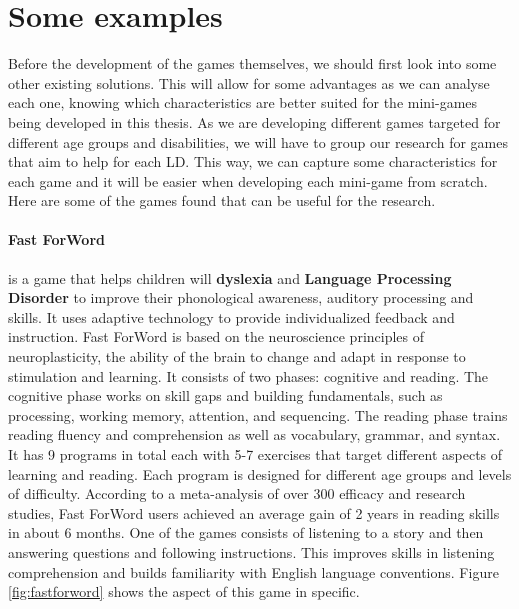 \section{Some examples}
\label{sec:gamesforld}

Before the development of the games themselves, we should first look into some other existing solutions. This will allow for some advantages as we can analyse each one, knowing which characteristics are better suited for the mini-games being developed in this thesis.
As we are developing different games targeted for different age groups and disabilities, we will have to group our research for games that aim to help for each LD. This way, we can capture some characteristics for each game and it will be easier when developing each mini-game from scratch.
Here are some of the games found that can be useful for the research.

\paragraph{Fast ForWord} \cite{fastforword} is a game that helps children will \textbf{dyslexia} and \textbf{Language Processing Disorder} to improve their phonological awareness, auditory processing and skills. It uses adaptive technology to provide individualized feedback and instruction.
Fast  ForWord is based on the neuroscience principles of neuroplasticity, the ability of the brain to change and adapt in response to stimulation and learning. It consists of two phases: cognitive and reading. The cognitive phase works on skill gaps and building fundamentals, such as processing, working memory, attention, and sequencing. The reading phase trains reading fluency and comprehension as well as vocabulary, grammar, and syntax. It has 9 programs in total each with 5-7 exercises that target different aspects of learning and reading. Each program is designed for different age groups and levels of difficulty.
According to a meta-analysis of over 300 efficacy and research studies, Fast ForWord users achieved an average gain of 2 years in reading skills in about 6 months. \cite{gemlearningFastFor}
One of the games consists of listening to a story and then answering questions and following instructions. This improves skills in listening comprehension and builds familiarity with English language conventions. Figure \ref{fig:fastforword} shows the aspect of this game in specific.

